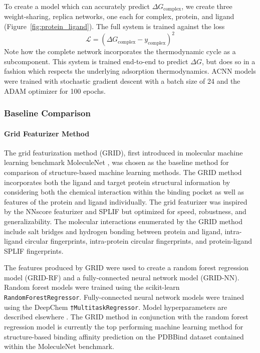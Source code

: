 To create a model which can accurately predict $\Delta G_{\textrm{complex}}$, we create three weight-sharing, replica networks, one each for complex, protein, and ligand (Figure~\ref{fig:protein_ligand}). The full system is trained against the loss
\[\mathcal{L} = (\Delta G_\textrm{complex} - y_\textrm{complex})^2\]
Note how the complete network incorporates the thermodynamic cycle as a subcomponent. This system is trained end-to-end to predict $\Delta G$, but does so in a fashion which respects the underlying adsorption thermodynamics.  ACNN models were trained with stochastic gradient descent with a batch size of 24 and the ADAM optimizer \cite{kingma2014adam} for 100 epochs.

\subsubsection{Baseline Comparison}
\paragraph{Grid Featurizer Method}
The grid featurization method (GRID), first introduced in molecular machine learning benchmark MoleculeNet \cite{wu2017moleculenet}, was chosen as the baseline method for comparison of structure-based machine learning methods. The GRID method incorporates both the ligand and target protein structural information by considering both the chemical interaction within the binding pocket as well as features of the protein and ligand individually. The grid featurizer was inspired by the NNscore featurizer \cite{durrant2011nnscore} and SPLIF \cite{da2014splif} but optimized for speed, robustness, and generalizability. The molecular interactions enumerated by the GRID method include salt bridges and hydrogen bonding between protein and ligand, intra-ligand circular fingerprints\cite{rogers2010extended}, intra-protein circular fingerprints, and protein-ligand SPLIF fingerprints.

The features produced by GRID were used to create a random forest regression model (GRID-RF) and a fully-connected neural network model (GRID-NN). Random forest models were trained using the scikit-learn \texttt{RandomForestRegressor}.  Fully-connected neural network models were trained using the DeepChem \texttt{†MultitaskRegressor}. Model hyperparameters are described elsewhere \cite{wu2017moleculenet}.  The GRID method in conjunction with the random forest regression model is currently the top performing machine learning method for structure-based binding affinity prediction on the PDBBind dataset contained within the MoleculeNet benchmark.

